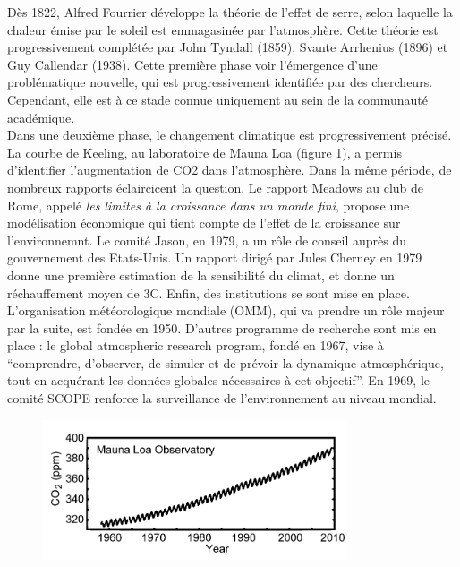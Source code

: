 Dès 1822, Alfred Fourrier développe la théorie de l'effet de serre, selon laquelle la chaleur émise par le soleil est emmagasinée par l'atmosphère. Cette théorie est progressivement complétée par John Tyndall (1859), Svante Arrhenius (1896) et Guy Callendar (1938). Cette première phase voir l'émergence d'une problématique nouvelle, qui est progressivement identifiée par des chercheurs. Cependant, elle est à ce stade connue uniquement au sein de la communauté académique. \\

Dans une deuxième phase, le changement climatique est progressivement précisé. La courbe de Keeling, au laboratoire de Mauna Loa (figure \ref{fig:keeling}), a permis d'identifier l'augmentation de CO2 dans l'atmosphère. Dans la même période, de nombreux rapports éclaircicent la question. Le rapport Meadows au club de Rome, appelé \emph{les limites à la croissance dans un monde fini}, propose une modélisation économique qui tient compte de l'effet de la croissance sur l'environnemnt. Le comité Jason, en 1979, a un rôle de conseil auprès du gouvernement des Etats-Unis. Un rapport dirigé par Jules Cherney en 1979 donne une première estimation de la sensibilité du climat, et donne un réchauffement moyen de 3\textdegree C. Enfin, des institutions se sont mise en place. L'organisation météorologique mondiale (OMM), qui va prendre un rôle majeur par la suite, est fondée en 1950. D'autres programme de recherche sont mis en place : le global atmospheric research program, fondé en 1967, vise à \enquote{comprendre, d’observer, de simuler et de prévoir la dynamique atmosphérique, tout en acquérant les données globales nécessaires à cet objectif}. En 1969, le comité SCOPE renforce la surveillance de l'environnement au niveau mondial. \\

\begin{figure}
    \centering

    \includegraphics[width=0.5\linewidth]{figures/keeling.png}

    \label{fig:keeling}
\end{figure}

